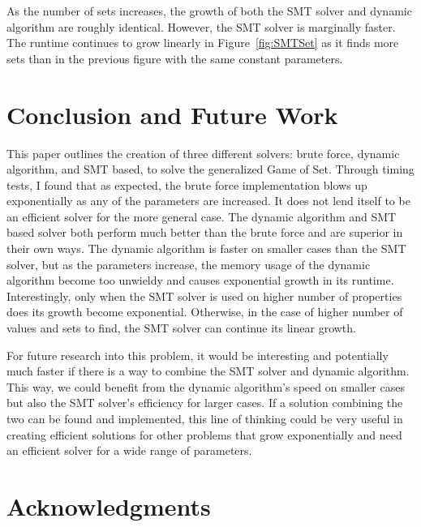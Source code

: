 \documentclass[pageno]{jpaper}
\begin{document}
As the number of sets increases, the growth of both the SMT solver and dynamic algorithm are roughly identical. However, the SMT solver is marginally faster. The runtime continues to grow linearly in Figure~\ref{fig:SMTSet} as it finds more sets than in the previous figure with the same constant parameters.



\section{Conclusion and Future Work}


This paper outlines the creation of three different solvers: brute force, dynamic algorithm, and SMT based, to solve the generalized Game of Set. Through timing tests, I found that as expected, the brute force implementation blows up exponentially as any of the parameters are increased. It does not lend itself to be an efficient solver for the more general case. The dynamic algorithm and SMT based solver both perform much better than the brute force and are superior in their own ways. The dynamic algorithm is faster on smaller cases than the SMT solver, but as the parameters increase, the memory usage of the dynamic algorithm become too unwieldy and causes exponential growth in its runtime. Interestingly, only when the SMT solver is used on higher number of properties does its growth become exponential. Otherwise, in the case of higher number of values and sets to find, the SMT solver can continue its linear growth.

For future research into this problem, it would be interesting and potentially much faster if there is a way to combine the SMT solver and dynamic algorithm. This way, we could benefit from the dynamic algorithm's speed on smaller cases but also the SMT solver's efficiency for larger cases. If a solution combining the two can be found and implemented, this line of thinking could be very useful in creating efficient solutions for other problems that grow exponentially and need an efficient solver for a wide range of parameters. 


\section{Acknowledgments}
\end{document}

